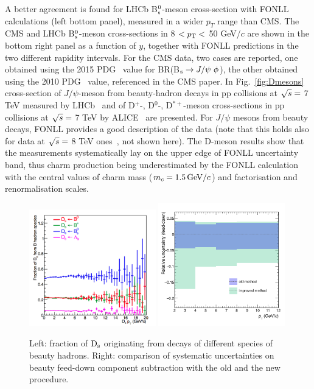 A better agreement is found for 
LHCb B$^0_{\rm s}$-meson cross-section with FONLL calculations (left bottom panel), measured in a wider 
$p_{T}$ range than CMS. The CMS and LHCb B$^0_{\rm s}$-meson cross-sections in 
8 $< p_{\rm T} <$ 50 GeV/$c$ are shown in 
the bottom right panel as a function of $y$, together with FONLL predictions in the 
two different rapidity intervals. For the CMS data, two cases are 
reported, one obtained using the 2015 PDG~\cite{Agashe:2014kda} value for 
BR(B$_{\rm s} \rightarrow J/{\rm \psi} ~\phi$),
the other obtained using the 2010 PDG~\cite{Nakamura:2010zzi} value, 
referenced in the CMS paper. 
In Fig.~\ref{fig:Dmesons} cross-section 
of $J/\psi$-meson from beauty-hadron decays in pp collisions at 
$\sqrt{s} = $ 7 TeV measured by LHCb~\cite{Aaij:2011jh} and 
of D$^{+}$-, D$^{0}$-, D$^{*+}$-meson cross-sections in pp collisions at $\sqrt{s} = $ 7 TeV by ALICE~\cite{ALICE:2011aa}
are presented. For $J/\psi$ mesons from beauty decays, FONLL provides a good description of 
the data (note that this holds also for data at $\sqrt{s} =$ 8 TeV ones~\cite{Aaij:2013yaa}, not shown here). 
The D-meson results show that the measurements 
systematically lay on the upper edge of FONLL uncertainty 
band, thus charm production being underestimated by the FONLL
calculation with the central values of charm mass ($m_c = 1.5 \, \mathrm{GeV}/c$) and
factorisation and renormalisation scales.\\
\begin{figure}[!h]
\begin{center}
\includegraphics[width=0.49\textwidth]{FigCap4/DsParents.png}
\includegraphics[width=0.49\textwidth]{FigCap4/comparisonFDerr_pass2_pass4.png}
\caption{Left: fraction of ${\rm D_s}$ originating from decays of different species of beauty hadrons. Right: comparison of systematic uncertainties on beauty feed-down component subtraction with the old and the new procedure.}
\label{fig:DsParentsAndFDunc}
\end{center}
\end{figure}
